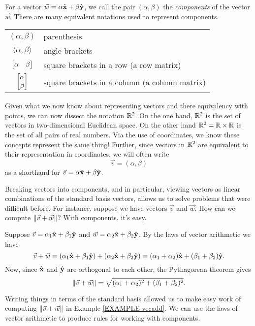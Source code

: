 For a vector $\vec w=\alpha{\hat {\mathbf x}}+\beta{\hat {\mathbf y}}$,
we call the pair $(\alpha,\beta)$  the 
\emph{components} of the vector $\vec w$.  There
are many equivalent notations used to represent components.
\begin{center}
	\begin{tabular}{c p{5cm}}
		$(\alpha,\beta)$ & parenthesis\\
		$\langle \alpha,\beta\rangle$ & angle brackets\\
		$\mat{\alpha&\beta}$ & square brackets in a row (a row matrix)\\
		$\mat{\alpha\\\beta}$ & square brackets in a column (a column matrix)\\
	\end{tabular}
\end{center}

Given what we now know about representing vectors and there equivalency
with points, we can now dissect the notation $\mathbb{R}^2$.
On the one hand, $\mathbb{R}^2$ is the set of vectors in two-dimensional Euclidean
space.  On the other hand $\mathbb{R}^2=\mathbb{R}\times \mathbb{R}$ is the set of all pairs of real 
numbers.  Via the use of coordinates, we know these concepts represent the
same thing!
Further,
since vectors in $\mathbb{R}^2$ are equivalent to their representation in coordinates,
we will often write
\[
	\vec v=(\alpha,\beta)
\]
as a shorthand for $\vec v=\alpha{\hat {\mathbf x}}+\beta{\hat {\mathbf y}}$.


Breaking vectors into components, and in particular, viewing vectors as linear
combinations of the standard basis vectors, allows us to solve problems that were
difficult before.  For instance, suppose we have vectors $\vec v$ and $\vec w$.
How can we compute $\lVert\vec v+\vec w\rVert$?  With components, it's easy.

\begin{example}
	\label{EXAMPLE-vecadd}
	Suppose $\vec v=\alpha_1{\hat {\mathbf x}}+\beta_1{\hat {\mathbf y}}$ and $\vec w=\alpha_2{\hat {\mathbf x}}+\beta_2{\hat {\mathbf y}}$.
	By the laws of vector arithmetic we have
	\[
		\vec v+\vec w=(\alpha_1{\hat {\mathbf x}}+\beta_1{\hat {\mathbf y}})+(\alpha_2{\hat {\mathbf x}}+\beta_2{\hat {\mathbf y}})
		=(\alpha_1+\alpha_2){\hat {\mathbf x}}+(\beta_1+\beta_2){\hat {\mathbf y}}.
	\]
	Now, since ${\hat {\mathbf x}}$ and ${\hat {\mathbf y}}$ are orthogonal to each other,
	the Pythagorean theorem gives
	\[
		\lVert\vec v+\vec w\rVert = \sqrt{(\alpha_1+\alpha_2)^2+(\beta_1+\beta_2)^2}.
	\]
\end{example}

Writing things in terms of the standard basis allowed us to make easy work
of computing $\lVert\vec v+\vec w\rVert$ in Example \ref{EXAMPLE-vecadd}.  We can
use the laws of vector arithmetic to produce rules for working with components.

